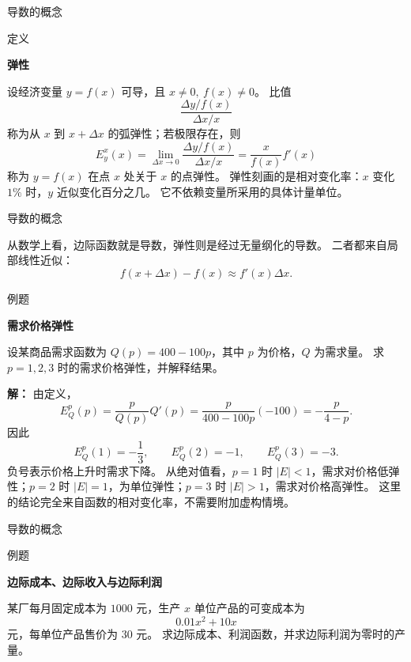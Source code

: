 \documentclass[aspectratio=169,10pt,fontset=fandol]{ctexbeamer}
\begin{document}
\begin{frame}[t,fragile]{导数的概念}
\normalsize
\begin{block}{定义}
{\normalsize
\textbf{弹性}\par

设经济变量 $y=f(x)$ 可导，且 $x\neq0,\ f(x)\neq0$。 比值
\[
\frac{\Delta y/f(x)}{\Delta x/x}
\]
称为从 $x$ 到 $x+\Delta x$ 的弧弹性；若极限存在，则
\[
E_y^x(x)=\lim_{\Delta x\to0}\frac{\Delta y/f(x)}{\Delta x/x}
=\frac{x}{f(x)}f'(x)
\]
称为 $y=f(x)$ 在点 $x$ 处关于 $x$ 的点弹性。 弹性刻画的是相对变化率：$x$ 变化 $1\%$ 时，$y$ 近似变化百分之几。 它不依赖变量所采用的具体计量单位。

}
\end{block}
\end{frame}
\begin{frame}[t,fragile]{导数的概念}
\footnotesize
{\footnotesize
从数学上看，边际函数就是导数，弹性则是经过无量纲化的导数。 二者都来自局部线性近似：
\[
f(x+\Delta x)-f(x)\approx f'(x)\Delta x.
\]


}
\begin{block}{例题}
{\footnotesize
\textbf{需求价格弹性}\par

设某商品需求函数为 $Q(p)=400-100p$，其中 $p$ 为价格，$Q$ 为需求量。 求 $p=1,2,3$ 时的需求价格弹性，并解释结果。

}
\end{block}
\pause
{\footnotesize
\textbf{解：}
由定义，
\[
E_Q^p(p)=\frac{p}{Q(p)}Q'(p)=\frac{p}{400-100p}(-100)=-\frac{p}{4-p}.
\]
因此
\[
E_Q^p(1)=-\frac13,\qquad E_Q^p(2)=-1,\qquad E_Q^p(3)=-3.
\]
负号表示价格上升时需求下降。 从绝对值看，$p=1$ 时 $|E|<1$，需求对价格低弹性；$p=2$ 时 $|E|=1$，为单位弹性；$p=3$ 时 $|E|>1$，需求对价格高弹性。 这里的结论完全来自函数的相对变化率，不需要附加虚构情境。

}
\end{frame}
\begin{frame}[t,fragile]{导数的概念}
\footnotesize
\begin{block}{例题}
{\footnotesize
\textbf{边际成本、边际收入与边际利润}\par

某厂每月固定成本为 $1000$ 元，生产 $x$ 单位产品的可变成本为
\[
0.01x^2+10x
\]
元，每单位产品售价为 $30$ 元。 求边际成本、利润函数，并求边际利润为零时的产量。

}
\end{block}
\end{frame}
\end{document}
